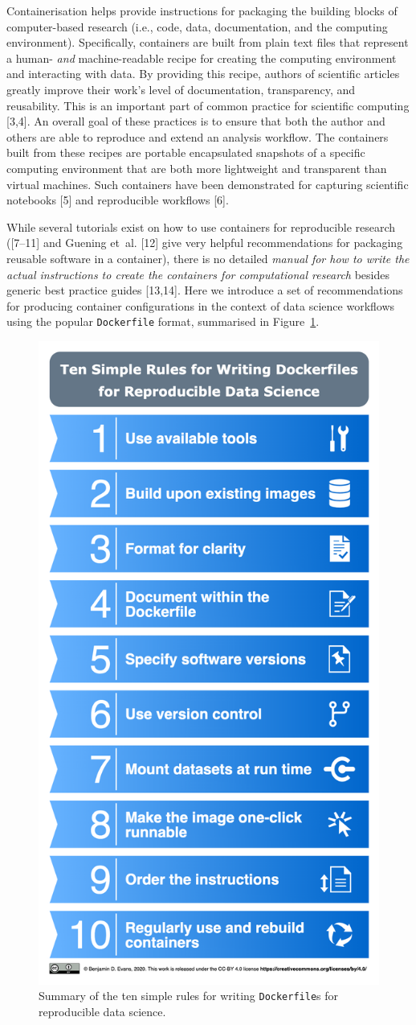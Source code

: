 \documentclass[10pt,letterpaper]{article}
\begin{document}
Containerisation helps provide instructions for packaging the building
blocks of computer-based research (i.e., code, data, documentation, and
the computing environment). Specifically, containers are built from
plain text files that represent a human- \emph{and} machine-readable
recipe for creating the computing environment and interacting with data.
By providing this recipe, authors of scientific articles greatly improve
their work's level of documentation, transparency, and reusability. This
is an important part of common practice for scientific computing
{[}3,4{]}. An overall goal of these practices is to ensure that both the
author and others are able to reproduce and extend an analysis workflow.
The containers built from these recipes are portable encapsulated
snapshots of a specific computing environment that are both more
lightweight and transparent than virtual machines. Such containers have
been demonstrated for capturing scientific notebooks {[}5{]} and
reproducible workflows {[}6{]}.

While several tutorials exist on how to use containers for reproducible
research ({[}7--11{]} and Guening et~al. {[}12{]} give very helpful
recommendations for packaging reusable software in a container), there
is no detailed \emph{manual for how to write the actual instructions to
create the containers for computational research} besides generic best
practice guides {[}13,14{]}. Here we introduce a set of recommendations
for producing container configurations in the context of data science
workflows using the popular \texttt{Dockerfile} format, summarised in
Figure~\ref{fig:summary}.

\begin{figure}[h]

{\centering \includegraphics[width=0.5\linewidth]{figures/summary} 

}

\caption{Summary of the ten simple rules for writing \texttt{Dockerfile}s for reproducible data science.}\label{fig:summary}
\end{figure}
\end{document}

